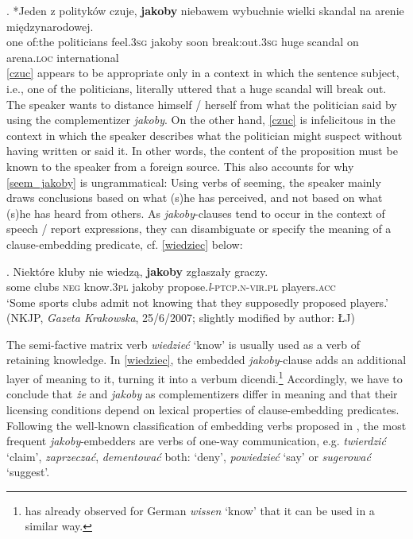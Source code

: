\documentclass[output=paper
,modfonts
,nonflat]{langsci/langscibook}
\newcommand{\glossformat}[1]{\textsc{#1}}
\newcommand{\thirdperson}{\glossformat{3}\xspace}
\newcommand{\acc}{\glossformat{acc}\xspace}
\newcommand{\loc}{\glossformat{loc}\xspace}
\newcommand{\negation}{\glossformat{neg}\xspace}
\newcommand{\lptcp}{\emph{l}\glossformat{-ptcp}\xspace}
\newcommand{\nvir}{\glossformat{n-vir}\xspace}
\newcommand{\pl}{\glossformat{pl}\xspace}
\newcommand{\sg}{\glossformat{sg}\xspace}
\newcommand{\nquelle}[1]{\newline\phantom{x}\hfill(#1)}
\begin{document}
\exg.		*Jeden z polityków czuje, \textbf{jakoby} niebawem wybuchnie wielki skandal na arenie międzynarodowej. \label{czuc} \\
		one {of:the} politicians feel.{\thirdperson}{\sg} jakoby soon {break:out}.{\thirdperson}{\sg} huge scandal on arena.{\loc} international \\    
  
 \ref{czuc} appears to be appropriate only in a context in which the sentence subject, i.e., one of the politicians, literally uttered that a huge scandal will break out. The speaker wants to distance himself / herself from what the politician said by using the complementizer \emph{jakoby}. On the other hand,  \ref{czuc} is infelicitous in the context in which the speaker describes what the politician might suspect without having written or said it. In other words, the content of the proposition must be known to the speaker from a foreign source. This also accounts for why \ref{seem_jakoby} is ungrammatical: Using verbs of seeming, the speaker mainly draws conclusions based on what (s)he has perceived, and not based on what (s)he has heard from others. As \emph{jakoby}-clauses tend to occur in the context of speech / report expressions, they can disambiguate or specify the meaning of a clause-embedding predicate, cf. \ref{wiedziec} below:

\exg.		Niektóre kluby nie wiedzą, \textbf{jakoby} zgłaszały graczy. \label{wiedziec} \\
		some clubs {\negation} know.{\thirdperson}{\pl} jakoby propose.{\lptcp}.{\nvir}.{\pl} players.{\acc} \\
		`Some sports clubs admit not knowing that they supposedly proposed players.'  \nquelle{NKJP, \emph{Gazeta Krakowska}, 25/6/2007; slightly modified by author: ŁJ}

The semi-factive matrix verb \emph{wiedzieć} `know' is usually used as a verb of retaining knowledge. In \ref{wiedziec}, the embedded \emph{jakoby}-clause adds an additional layer of meaning to it, turning it into a verbum dicendi.\footnote{\textcite[142-148]{Reis1977} has already observed for German \emph{wissen} `know' that it can be used in a similar way.
} 
Accordingly, we have to conclude that \emph{że} and \emph{jakoby} as complementizers differ in meaning and that their licensing conditions depend on lexical properties of clause-embedding predicates. Following the well-known classification of embedding verbs proposed in \textcite{Karttunen1977}, the most frequent \emph{jakoby}-embedders are verbs of one-way communication, e.g. \emph{twierdzić} `claim', \emph{zaprzeczać}, \emph{dementować} both: `deny', \emph{powiedzieć} `say' or \emph{sugerować} `suggest'.
\end{document}
